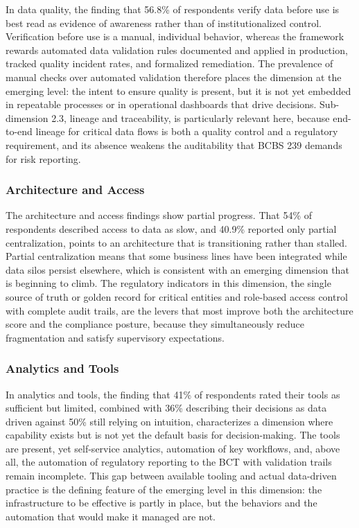 In data quality, the finding that 56.8\% of respondents verify data before use is best read as evidence of awareness rather than of institutionalized control. Verification before use is a manual, individual behavior, whereas the framework rewards automated data validation rules documented and applied in production, tracked quality incident rates, and formalized remediation. The prevalence of manual checks over automated validation therefore places the dimension at the emerging level: the intent to ensure quality is present, but it is not yet embedded in repeatable processes or in operational dashboards that drive decisions. Sub-dimension 2.3, lineage and traceability, is particularly relevant here, because end-to-end lineage for critical data flows is both a quality control and a regulatory requirement, and its absence weakens the auditability that BCBS 239 demands for risk reporting.

\subsubsection{Architecture and Access}

The architecture and access findings show partial progress. That 54\% of respondents described access to data as slow, and 40.9\% reported only partial centralization, points to an architecture that is transitioning rather than stalled. Partial centralization means that some business lines have been integrated while data silos persist elsewhere, which is consistent with an emerging dimension that is beginning to climb. The regulatory indicators in this dimension, the single source of truth or golden record for critical entities and role-based access control with complete audit trails, are the levers that most improve both the architecture score and the compliance posture, because they simultaneously reduce fragmentation and satisfy supervisory expectations.

\subsubsection{Analytics and Tools}

In analytics and tools, the finding that 41\% of respondents rated their tools as sufficient but limited, combined with 36\% describing their decisions as data driven against 50\% still relying on intuition, characterizes a dimension where capability exists but is not yet the default basis for decision-making. The tools are present, yet self-service analytics, automation of key workflows, and, above all, the automation of regulatory reporting to the BCT with validation trails remain incomplete. This gap between available tooling and actual data-driven practice is the defining feature of the emerging level in this dimension: the infrastructure to be effective is partly in place, but the behaviors and the automation that would make it managed are not.

